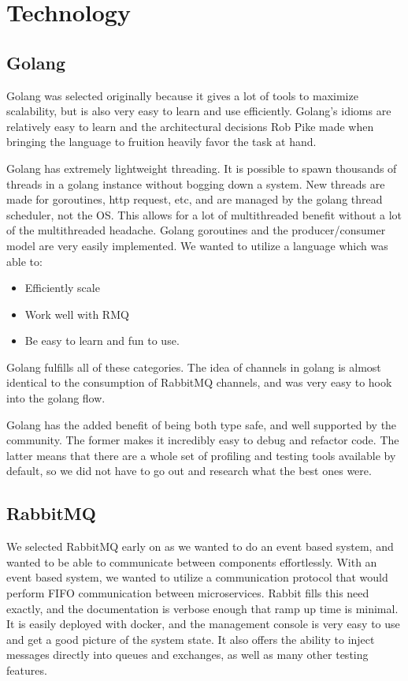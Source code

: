 \section{Technology}

\subsection{Golang}
Golang was selected originally because it gives a lot of tools to maximize scalability, but is also very easy to learn and use efficiently. Golang’s idioms are relatively easy to learn and the architectural decisions Rob Pike made when bringing the language to fruition heavily favor the task at hand.

Golang has extremely lightweight threading. It is possible to spawn thousands of threads in a golang instance without bogging down a system. New threads are made for goroutines, http request, etc, and are managed by the golang thread scheduler, not the OS. This allows for a lot of multithreaded benefit without a lot of the multithreaded headache. Golang goroutines and the producer/consumer model are very easily implemented. We wanted to utilize a language which was able to:

\begin{itemize}
  \item Efficiently scale
  \item Work well with RMQ
  \item Be easy to learn and fun to use.
\end{itemize}

Golang fulfills all of these categories. The idea of channels in golang is almost identical to the consumption of RabbitMQ channels, and was very easy to hook into the golang flow.

Golang has the added benefit of being both type safe, and well supported by the community. The former makes it incredibly easy to debug and refactor code. The latter means that there are a whole set of profiling and testing tools available by default, so we did not have to go out and research what the best ones were.

\subsection{RabbitMQ}
We selected RabbitMQ early on as we wanted to do an event based system, and wanted to be able to communicate between components effortlessly. With an event based system, we wanted to utilize a communication protocol that would perform FIFO communication between microservices. Rabbit fills this need exactly, and the documentation is verbose enough that ramp up time is minimal. It is easily deployed with docker, and the management console is very easy to use and get a good picture of the system state. It also offers the ability to inject messages directly into queues and exchanges, as well as many other testing features.

